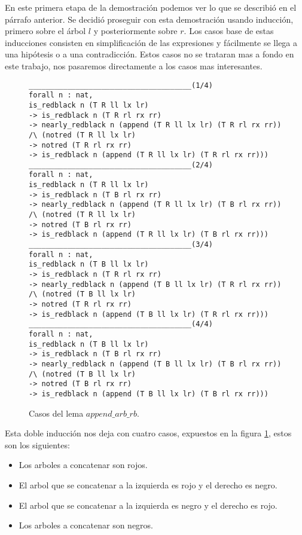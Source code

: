 En este primera etapa de la demostraci\'on podemos ver lo que se describió en el párrafo anterior.
Se decidió proseguir con esta demostraci\'on usando inducci\'on, primero sobre el árbol $l$ y
posteriormente sobre $r$. Los casos base de estas inducciones consisten en simplificación de las
expresiones y fácilmente se llega a una hipótesis o a una contradicci\'on. Estos casos no se
trataran mas a fondo en este trabajo, nos pasaremos directamente a los casos mas interesantes.

\begin{figure}[!ht]
\centering
\captionsetup{justification=centering}
\begin{verbatim}
______________________________________(1/4)
forall n : nat,
is_redblack n (T R ll lx lr)
-> is_redblack n (T R rl rx rr)
-> nearly_redblack n (append (T R ll lx lr) (T R rl rx rr))
/\ (notred (T R ll lx lr)
-> notred (T R rl rx rr)
-> is_redblack n (append (T R ll lx lr) (T R rl rx rr)))
______________________________________(2/4)
forall n : nat,
is_redblack n (T R ll lx lr)
-> is_redblack n (T B rl rx rr)
-> nearly_redblack n (append (T R ll lx lr) (T B rl rx rr))
/\ (notred (T R ll lx lr)
-> notred (T B rl rx rr)
-> is_redblack n (append (T R ll lx lr) (T B rl rx rr)))
______________________________________(3/4)
forall n : nat,
is_redblack n (T B ll lx lr)
-> is_redblack n (T R rl rx rr)
-> nearly_redblack n (append (T B ll lx lr) (T R rl rx rr))
/\ (notred (T B ll lx lr)
-> notred (T R rl rx rr)
-> is_redblack n (append (T B ll lx lr) (T R rl rx rr)))
______________________________________(4/4)
forall n : nat,
is_redblack n (T B ll lx lr)
-> is_redblack n (T B rl rx rr)
-> nearly_redblack n (append (T B ll lx lr) (T B rl rx rr))
/\ (notred (T B ll lx lr)
-> notred (T B rl rx rr)
-> is_redblack n (append (T B ll lx lr) (T B rl rx rr)))
\end{verbatim}
\caption{Casos del lema $append\_arb\_rb$.}
\label{casos_append}
\end{figure}

Esta doble inducci\'on nos deja con cuatro casos, expuestos en la figura \ref{casos_append}, estos
son los siguientes:
\begin{itemize}
    \item Los arboles a concatenar son rojos.
    \item El arbol que se concatenar a la izquierda es rojo y el derecho es negro.
    \item El arbol que se concatenar a la izquierda es negro y el derecho es rojo.
    \item Los arboles a concatenar son negros.
\end{itemize}

